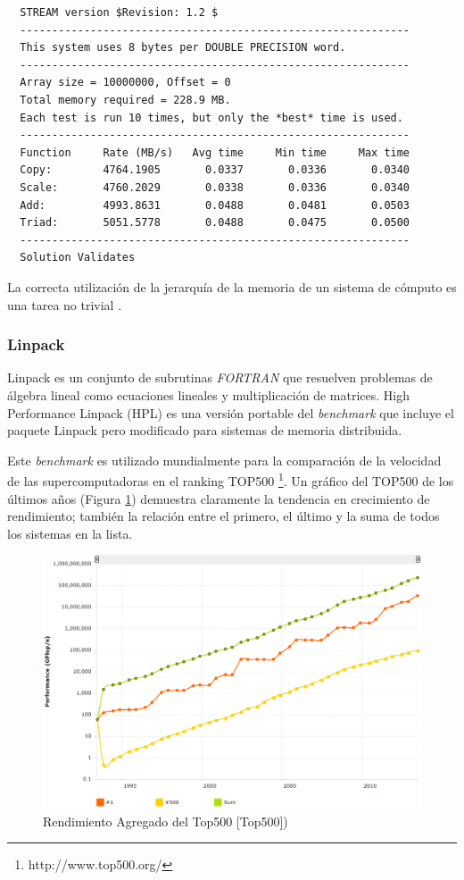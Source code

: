 \documentclass[a4paper]{report}
\begin{document}
{\small
\begin{verbatim}
  STREAM version $Revision: 1.2 $
  -------------------------------------------------------------
  This system uses 8 bytes per DOUBLE PRECISION word.
  -------------------------------------------------------------
  Array size = 10000000, Offset = 0
  Total memory required = 228.9 MB.
  Each test is run 10 times, but only the *best* time is used.
  -------------------------------------------------------------
  Function     Rate (MB/s)   Avg time     Min time     Max time
  Copy:        4764.1905       0.0337       0.0336       0.0340
  Scale:       4760.2029       0.0338       0.0336       0.0340
  Add:         4993.8631       0.0488       0.0481       0.0503
  Triad:       5051.5778       0.0488       0.0475       0.0500
  -------------------------------------------------------------
  Solution Validates
\end{verbatim}
}

\bigskip

La correcta utilización de la jerarquía de la memoria de un sistema de cómputo es una tarea no trivial \cite{memory}.

\subsubsection{Linpack}

Linpack \cite{linpack} es un conjunto de subrutinas {\it FORTRAN} que resuelven problemas de álgebra lineal como ecuaciones lineales y multiplicación de
matrices. High Performance Linpack (HPL) \cite{hpl} es una versión portable del {\it benchmark} que incluye el paquete Linpack pero modificado para sistemas de memoria distribuida.

\bigskip

Este {\it benchmark} es utilizado mundialmente para la comparación de la velocidad de las supercomputadoras en el ranking TOP500 \footnote{http://www.top500.org/}. 
Un gráfico del TOP500 de los últimos años (Figura \ref{fig:top500}) demuestra claramente la tendencia en crecimiento de rendimiento; también la relación entre el primero,
el último y la suma de todos los sistemas en la lista.

\begin{figure}[H]
\centering
\includegraphics[width=12cm]{top500.png}
\caption{Rendimiento Agregado del Top500 [Top500])}
\label{fig:top500}
\end{figure}
\end{document}

